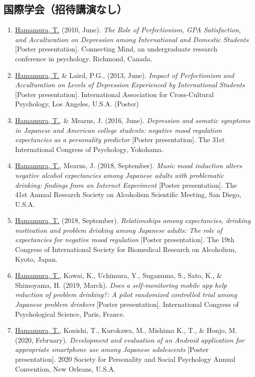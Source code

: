 \documentclass[11pt,a4paper]{article}
\begin{document}
\subsection{国際学会（招待講演なし）}
\begin{enumerate}
	\item \underline{Hamamura, T.} (2010, June). \textit{The Role of Perfectionism, GPA Satisfaction, and Acculturation on Depression among International and Domestic Students} [Poster presentation]. Connecting Mind, an undergraduate research conference in psychology. Richmond, Canada.
	\item \underline{Hamamura, T.} \& Laird, P.G., (2013, June). \textit{Impact of Perfectionism and Acculturation on Levels of Depression Experienced by International Students} [Poster presentation]. International Association for Cross-Cultural Psychology, Los Angeles, U.S.A. (Poster)
	\item \underline{Hamamura, T.}, \& Mearns, J. (2016, June). \textit{Depression and somatic symptoms in Japanese and American college students: negative mood regulation expectancies as a personality predictor} [Poster presentation]. The 31st International Congress of Psychology, Yokohama.
	\item \underline{Hamamura, T.}, Mearns, J. (2018, September). \textit{Music mood induction alters negative alcohol expectancies among Japanese adults with problematic drinking: findings from an Internet Experiment} [Poster presentation]. The 41st Annual Research Society on Alcoholism Scientific Meeting, San Diego, U.S.A.
	\item \underline{Hamamura, T.} (2018, September). \textit{Relationships among expectancies, drinking motivation and problem drinking among Japanese adults: The role of expectancies for negative mood regulation} [Poster presentation]. The 19th Congress of International Society for Biomedical Research on Alcoholism, Kyoto, Japan.
	\item \underline{Hamamura, T.}, Kawai, K., Uchimura, Y., Suganuma, S., Sato, K., \& Shimoyama, H. (2019, March). \textit{Does a self-monitoring mobile app help reduction of problem drinking?: A pilot randomized controlled trial among Japanese problem drinkers} [Poster presentation]. International Congress of Psychological Science, Paris, France.
	\item \underline{Hamamura, T.}, Konishi, T., Kurokawa, M., Mishima K., T., \& Honjo, M. (2020, February). \textit{Development and evaluation of an Android application for appropriate smartphone use among Japanese adolescents} [Poster presentation]. 2020 Society for Personality and Social Psychology Annual Convention, New Orleans, U.S.A.

\end{enumerate}
\end{document}
